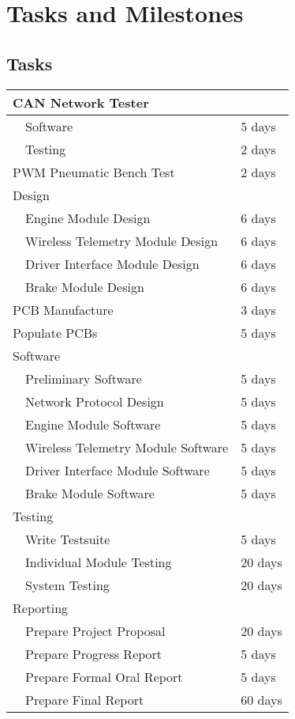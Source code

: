 %
%
%
%

\chapter{Tasks and Milestones}

\section{Tasks}

\begin{center}
  \begin{tabular}{|l|l|l|}
  \hline 
  \multicolumn{3}{|l|}{CAN Network Tester}\\
  \hline 
  & Software & 5 days\\
  & Testing & 2 days\\
  \hline 
  \multicolumn{2}{|l|}{PWM Pneumatic Bench Test} & 2 days\\
  \hline 
  \multicolumn{3}{|l|}{Design}\\
  \hline 
  & Engine Module Design & 6 days\\
  & Wireless Telemetry Module Design & 6 days\\
  & Driver Interface Module Design & 6 days\\
  & Brake Module Design & 6 days\\
  \hline 
  \multicolumn{2}{|l|}{PCB Manufacture} & 3 days\\
  \hline 
  \multicolumn{2}{|l|}{Populate PCBs} & 5 days\\
  \hline 
  \multicolumn{3}{|l|}{Software}\\
  \hline 
  & Preliminary Software & 5 days\\
  & Network Protocol Design & 5 days\\
  & Engine Module Software & 5 days\\
  & Wireless Telemetry Module Software & 5 days\\
  & Driver Interface Module Software & 5 days\\
  & Brake Module Software & 5 days\\
  \hline 
  \multicolumn{3}{|l|}{Testing}\\
  \hline 
  & Write Testsuite & 5 days\\
  & Individual Module Testing & 20 days\\
  & System Testing & 20 days\\
  \hline
  \multicolumn{3}{|l|}{Reporting}\\
  \hline
  & Prepare Project Proposal & 20 days\\
  & Prepare Progress Report & 5 days\\
  & Prepare Formal Oral Report & 5 days\\
  & Prepare Final Report & 60 days\\
  \hline
  \end{tabular}
\end{center}

